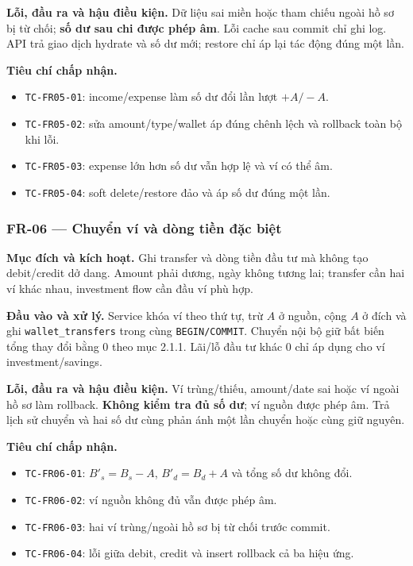 \textbf{Lỗi, đầu ra và hậu điều kiện.} Dữ liệu sai miền hoặc tham chiếu ngoài hồ sơ bị từ chối; \textbf{số dư sau chi được phép âm}. Lỗi cache sau commit chỉ ghi log. API trả giao dịch hydrate và số dư mới; restore chỉ áp lại tác động đúng một lần.

\textbf{Tiêu chí chấp nhận.}
\begin{itemize}
  \item \texttt{TC-FR05-01}: income/expense làm số dư đổi lần lượt $+A/-A$.
  \item \texttt{TC-FR05-02}: sửa amount/type/wallet áp đúng chênh lệch và rollback toàn bộ khi lỗi.
  \item \texttt{TC-FR05-03}: expense lớn hơn số dư vẫn hợp lệ và ví có thể âm.
  \item \texttt{TC-FR05-04}: soft delete/restore đảo và áp số dư đúng một lần.
\end{itemize}

\subsubsection{FR-06 --- Chuyển ví và dòng tiền đặc biệt}

\textbf{Mục đích và kích hoạt.} Ghi transfer và dòng tiền đầu tư mà không tạo debit/credit dở dang. Amount phải dương, ngày không tương lai; transfer cần hai ví khác nhau, investment flow cần đầu ví phù hợp.

\textbf{Đầu vào và xử lý.} Service khóa ví theo thứ tự, trừ $A$ ở nguồn, cộng $A$ ở đích và ghi \texttt{wallet\_transfers} trong cùng \texttt{BEGIN/COMMIT}. Chuyển nội bộ giữ bất biến tổng thay đổi bằng 0 theo mục 2.1.1. Lãi/lỗ đầu tư khác 0 chỉ áp dụng cho ví investment/savings.

\textbf{Lỗi, đầu ra và hậu điều kiện.} Ví trùng/thiếu, amount/date sai hoặc ví ngoài hồ sơ làm rollback. \textbf{Không kiểm tra đủ số dư}; ví nguồn được phép âm. Trả lịch sử chuyển và hai số dư cùng phản ánh một lần chuyển hoặc cùng giữ nguyên.

\textbf{Tiêu chí chấp nhận.}
\begin{itemize}
  \item \texttt{TC-FR06-01}: $B'_s=B_s-A$, $B'_d=B_d+A$ và tổng số dư không đổi.
  \item \texttt{TC-FR06-02}: ví nguồn không đủ vẫn được phép âm.
  \item \texttt{TC-FR06-03}: hai ví trùng/ngoài hồ sơ bị từ chối trước commit.
  \item \texttt{TC-FR06-04}: lỗi giữa debit, credit và insert rollback cả ba hiệu ứng.
\end{itemize}

